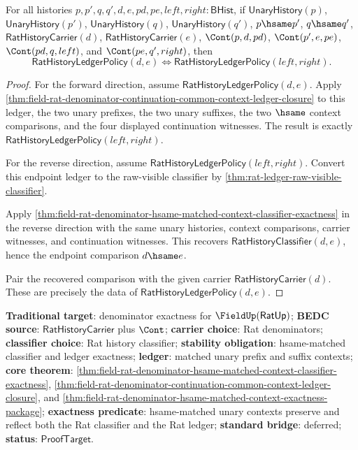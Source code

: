 \begin{theorem}
\label{thm:field-rat-denominator-hsame-matched-context-ledger-exactness}
For all histories
$p,p',q,q',d,e,pd,pe,left,right:\mathsf{BHist}$, if
$\mathsf{UnaryHistory}(p)$, $\mathsf{UnaryHistory}(p')$,
$\mathsf{UnaryHistory}(q)$, $\mathsf{UnaryHistory}(q')$, $p\hsame p'$,
$q\hsame q'$, $\mathsf{RatHistoryCarrier}(d)$,
$\mathsf{RatHistoryCarrier}(e)$, $\Cont(p,d,pd)$, $\Cont(p',e,pe)$,
$\Cont(pd,q,left)$, and $\Cont(pe,q',right)$, then
$$
\mathsf{RatHistoryLedgerPolicy}(d,e)
\Longleftrightarrow
\mathsf{RatHistoryLedgerPolicy}(left,right).
$$
\end{theorem}
\begin{proof}
For the forward direction, assume
$\mathsf{RatHistoryLedgerPolicy}(d,e)$. Apply
\autoref{thm:field-rat-denominator-continuation-common-context-ledger-closure}
to this ledger, the two unary prefixes, the two unary suffixes, the two
$\hsame$ context comparisons, and the four displayed continuation witnesses.
The result is exactly $\mathsf{RatHistoryLedgerPolicy}(left,right)$.

For the reverse direction, assume
$\mathsf{RatHistoryLedgerPolicy}(left,right)$. Convert this endpoint ledger to
the raw-visible classifier by
\autoref{thm:rat-ledger-raw-visible-classifier}.

Apply
\autoref{thm:field-rat-denominator-hsame-matched-context-classifier-exactness}
in the reverse direction with the same unary histories, context comparisons,
carrier witnesses, and continuation witnesses. This recovers
$\mathsf{RatHistoryClassifier}(d,e)$, hence the endpoint comparison
$d\hsame e$.

Pair the recovered comparison with the given carrier
$\mathsf{RatHistoryCarrier}(d)$. These are precisely the data of
$\mathsf{RatHistoryLedgerPolicy}(d,e)$.
\end{proof}

\textbf{Traditional target}: denominator exactness for
$\FieldUp(\mathsf{RatUp})$; \textbf{BEDC source}:
$\mathsf{RatHistoryCarrier}$ plus $\Cont$; \textbf{carrier choice}: Rat
denominators; \textbf{classifier choice}: Rat history classifier;
\textbf{stability obligation}: hsame-matched classifier and ledger exactness;
\textbf{ledger}: matched unary prefix and suffix contexts; \textbf{core theorem}:
\autoref{thm:field-rat-denominator-hsame-matched-context-classifier-exactness},
\autoref{thm:field-rat-denominator-continuation-common-context-ledger-closure},
and
\autoref{thm:field-rat-denominator-hsame-matched-context-exactness-package};
\textbf{exactness predicate}: hsame-matched unary contexts preserve and reflect
both the Rat classifier and the Rat ledger; \textbf{standard bridge}: deferred;
\textbf{status}: $\mathsf{ProofTarget}$.
